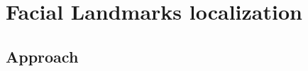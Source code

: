 \chapter{Facial Landmarks localization}
\label{sec:FLL}

\section{Approach}
\label{sec:FLApproach}

\
